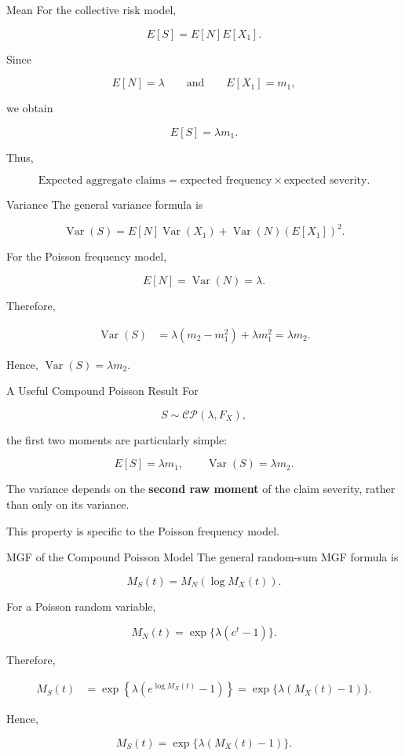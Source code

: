 \documentclass[
  ignorenonframetext,
  aspectratio=169,
]{beamer}
\begin{document}
\begin{frame}{Mean}
\protect{}\label{mean}
For the collective risk model,

\[
E[S]=E[N]E[X_1].
\]

Since

\[
E[N]=\lambda
\qquad\text{and}\qquad
E[X_1]=m_1,
\]

we obtain

\[
\boxed{E[S]=\lambda m_1}.
\]

Thus,

\[
\boxed{
\text{Expected aggregate claims}
=
\text{expected frequency}
\times
\text{expected severity}
}.
\]
\end{frame}

\begin{frame}{Variance}
\protect{}\label{variance}
The general variance formula is

\[
\operatorname{Var}(S)
=
E[N]\operatorname{Var}(X_1)
+
\operatorname{Var}(N)(E[X_1])^2.
\]

For the Poisson frequency model,

\[
E[N]=\operatorname{Var}(N)=\lambda.
\]

Therefore,

\[
\begin{aligned}
\operatorname{Var}(S)
&=\lambda(m_2-m_1^2)+\lambda m_1^2=\lambda m_2.
\end{aligned}
\]

Hence, \(\boxed{\operatorname{Var}(S)=\lambda m_2}.\)
\end{frame}

\begin{frame}{A Useful Compound Poisson Result}
\protect{}\label{a-useful-compound-poisson-result}
For

\[
S\sim\mathcal{CP}(\lambda,F_X),
\]

the first two moments are particularly simple:

\[
\boxed{
E[S]=\lambda m_1,
\qquad
\operatorname{Var}(S)=\lambda m_2.
}
\]

The variance depends on the \textbf{second raw moment} of the claim
severity, rather than only on its variance.

This property is specific to the Poisson frequency model.
\end{frame}

\begin{frame}{MGF of the Compound Poisson Model}
\protect{}\label{mgf-of-the-compound-poisson-model}
The general random-sum MGF formula is

\[
M_S(t)
=
M_N\left(\log M_X(t)\right).
\]

For a Poisson random variable,

\[
M_N(t)=\exp\{\lambda(e^t-1)\}.
\]

Therefore,

\[
\begin{aligned}
M_S(t)
&=
\exp\left\{
\lambda\left(
e^{\log M_X(t)}-1
\right)
\right\}=
\exp\{\lambda(M_X(t)-1)\}.
\end{aligned}
\]

Hence,

\[
\boxed{
M_S(t)=\exp\{\lambda(M_X(t)-1)\}
}.
\]
\end{frame}
\end{document}

